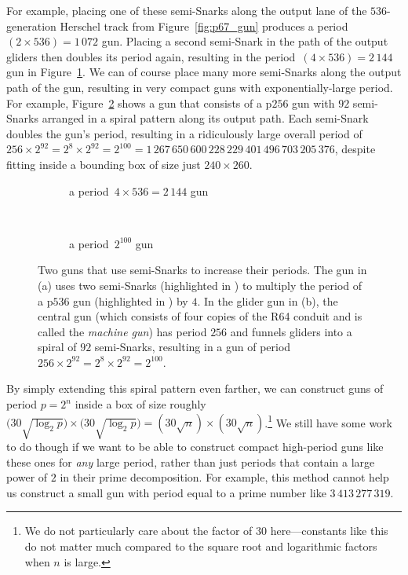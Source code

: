 For example, placing one of these semi-Snarks along the output lane of the $536$-generation Herschel track from Figure~\ref{fig:p67_gun} produces a period~$(2 \times 536)=1\, 072$ gun. Placing a second semi-Snark in the path of the output gliders then doubles its period again, resulting in the period~$(4 \times 536)=2\, 144$ gun in Figure~\ref{fig:p2144_gun}. We can of course place many more semi-Snarks along the output path of the gun, resulting in very compact guns with exponentially-large period. For example, Figure~\ref{fig:p_2_100_gun} shows a gun that consists of a p$256$ gun with $92$ semi-Snarks arranged in a spiral pattern along its output path. Each semi-Snark doubles the gun's period, resulting in a ridiculously large overall period of $256 \times 2^{92} = 2^8 \times 2^{92} = 2^{100} = 1\,267\,650\,600\,228\,229\,401\,496\,703\,205\,376$, despite fitting inside a bounding box of size just $240 \times 260$.

\begin{figure}[!htb]
	\centering
	\begin{subfigure}{0.39\textwidth}
		\centering\vspace*{2.2cm}
		\caption{a period~$4 \times 536 = 2\, 144$ gun}
		\label{fig:p2144_gun}
	\end{subfigure} \ \ \ \ %
	\begin{subfigure}{0.57\textwidth}
		\centering
		\caption{a period~$2^{100}$ gun}
		\label{fig:p_2_100_gun}
	\end{subfigure}
	\caption{Two guns that use semi-Snarks to increase their periods. The gun in (a) uses two semi-Snarks (highlighted in ) to multiply the period of a p$536$ gun (highlighted in ) by $4$. In the glider gun in (b), the central gun (which consists of four copies of the R64 conduit and is called the \emph{machine gun}) has period $256$ and funnels gliders into a spiral of $92$ semi-Snarks, resulting in a gun of period $256 \times 2^{92} = 2^8 \times 2^{92} = 2^{100}$.}
	\label{fig:semi_snark_compact_guns}
\end{figure}

By simply extending this spiral pattern even farther, we can construct guns of period $p = 2^n$ inside a box of size roughly $\big(30\sqrt{\log_2{p}}\big) \times \big(30\sqrt{\log_2{p}}\big) = (30\sqrt{n}) \times (30\sqrt{n})$.\footnote{We do not particularly care about the factor of $30$ here---constants like this do not matter much compared to the square root and logarithmic factors when $n$ is large.} We still have some work to do though if we want to be able to construct compact high-period guns like these ones for \emph{any} large period, rather than just periods that contain a large power of $2$ in their prime decomposition. For example, this method cannot help us construct a small gun with period equal to a prime number like $3\, 413\, 277\, 319$.

